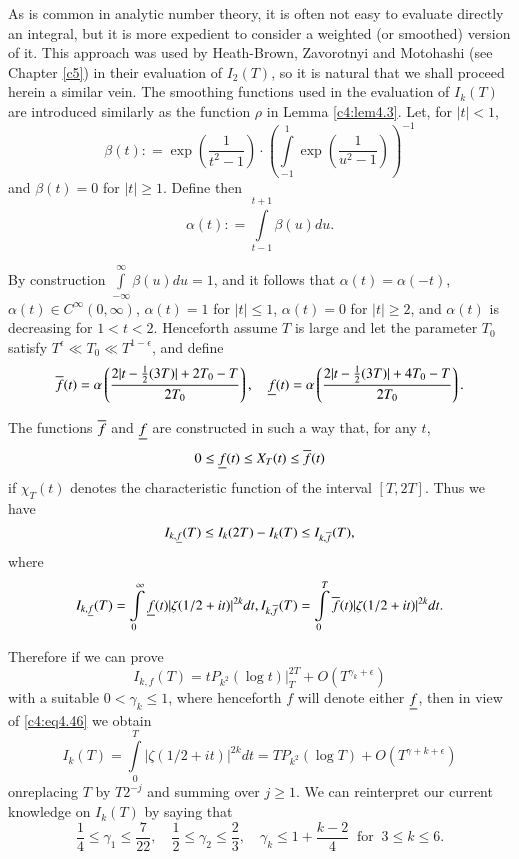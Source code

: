 As is common in analytic number theory, it is often not easy to
evaluate directly an integral, but it is more expedient to consider a
weighted (or smoothed) version of it. This approach was used by
Heath-Brown, Zavorotnyi and Motohashi (see Chapter \ref{c5}) in their
evaluation of $I_2 (T)$, so it is natural that we shall proceed
here\pageoriginale in a similar vein. The smoothing functions used in
the evaluation of $I_k (T)$ are introduced similarly as the function
$\rho$ in Lemma \ref{c4:lem4.3}. Let, for $|t|<1$,
$$
\beta (t) : = \exp \left( \frac{1}{t^2-1}\right)\cdot
\left(\int\limits_{-1}^1 \exp \left(\frac{1}{u^2-1}\right) \right)^{-1}
$$
and $\beta(t)=0$ for $|t|\geq 1$. Define then
$$
\alpha (t) : = \int\limits_{t-1}^{t+1} \beta (u) du.
$$

By construction $\int\limits_{-\infty}^{\infty} \beta (u) du =1$, and
it follows that $\alpha(t) = \alpha (-t)$, $\alpha (t) \in C^\infty
(0, \infty)$, $\alpha(t)=1$ for $|t|\leq 1$, $\alpha(t)=0$ for
$|t|\geq 2$, and $\alpha(t)$ is decreasing for $1 < t < 2$. Henceforth
assume $T$ is large and let the parameter $T_0$ satisfy $T^\epsilon
\ll T_0 \ll T^{1- \epsilon}$, and define
{\fontsize{10pt}{12pt}\selectfont
$$
\overline{f} (t) = \alpha \left(\frac{2 | t - \frac{1}{2} (3T)| + 2 T_0
  -T}{2T_0} \right),\quad \underline{f} (t) = \alpha \left(\frac{2|t - \frac{1}{2}
  (3T)| + 4T_0 -T}{2T_0}\right). 
$$}

The functions $\overline{f}$ and $\underline{f}$ are constructed in such a way
that, for any $t$,
$$
0 \leq \underline{f} (t) \leq X_T (t) \leq \overline{f} (t)
$$
if $\chi_T (t)$ denotes the characteristic function of the interval
$[T, 2T]$. Thus we have
\begin{equation}
  I_{k, \underline{f}}(T) \leq I_k (2T) - I_k (T) \leq I_{k, \overline{f}}
  (T),\label{c4:eq4.46} 
\end{equation}
where
{\fontsize{10pt}{12pt}\selectfont
\begin{equation}
  I_{k, \underline{f}}(T)= \int\limits_0^\infty \underline{f} (t) |\zeta(1/2 +
  it)|^{2k}dt, I_{k, \overline{f}} (T) = \int\limits_0^T \overline{f} (t) |\zeta
  (1/2 + it)|^{2k}dt.\label{c4:eq4.47}
\end{equation}}

Therefore if we can prove
\begin{equation}
  I_{k, f}(T) = t P_{k^2} (\log t)\big|_T^{2T} + O(T^{\gamma_k +
    \epsilon})\label{c4:eq4.48} 
\end{equation}
with a suitable $0 < \gamma_k \leq 1$, where henceforth $f$ will
denote either $\underline{f}$, then in view of \eqref{c4:eq4.46} we obtain 
\begin{equation}
  I_k (T) = \int\limits_0^T |\zeta (1/2 + it)|^{2k} dt = TP_{k^2}(\log
  T) + O(T^{\gamma +k+\epsilon})\label{c4:eq4.49}
\end{equation}
on\pageoriginale replacing $T$ by $T 2^{-j}$ and summing over $j \geq
1$. We can reinterpret our current knowledge on $I_k (T)$ by saying
that
$$ 
\frac{1}{4} \leq \gamma_1 \leq \frac{7}{22} ,\quad \frac{1}{2} \leq
\gamma_2 \leq \frac{2}{3},\quad  \gamma_k \leq 1 +
\frac{k-2}{4}~\text{ for }~ 3 \leq k
\leq 6.
$$

